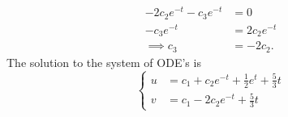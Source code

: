 \documentclass{zc-ust-hw}
\begin{document}
\begin{enumerate}
\begin{sol}
\begin{align}
            -2c_{2}e^{-t}-c_{3}e^{-t}&=0 \\
            -c_{3}e^{-t}&=2c_{2}e^{-t} \\
            \implies c_{3}&=-2c_{2}
          .\end{align}
          The solution to the system of ODE's is
          \begin{equation}
            \begin{cases}
              u &= c_{1}+c_{2}e^{-t} + \frac{1}{2}e^{t} + \frac{5}{3}t \\
              v &= c_{1}-2c_{2}e^{-t}+\frac{5}{3}t
            \end{cases}
          \end{equation}
    \end{sol}
\end{enumerate}
\end{document}
